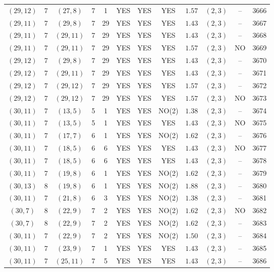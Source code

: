\begin{longtable}{|c|c|c|c|c|c|c|c|c|c|c|c|}
$(29,12)$ & 7 & $(27,8)$ & 7 & 1 & YES & YES & YES & $1.57$ & $(2,3)$ & -- & 3666\\
$(29,11)$ & 7 & $(29,8)$ & 7 & 29 & YES & YES & YES & $1.43$ & $(2,3)$ & -- & 3667\\
$(29,11)$ & 7 & $(29,11)$ & 7 & 29 & YES & YES & YES & $1.43$ & $(2,3)$ & -- & 3668\\
$(29,11)$ & 7 & $(29,11)$ & 7 & 29 & YES & YES & YES & $1.57$ & $(2,3)$ & NO & 3669\\
$(29,12)$ & 7 & $(29,8)$ & 7 & 29 & YES & YES & YES & $1.43$ & $(2,3)$ & -- & 3670\\
$(29,12)$ & 7 & $(29,11)$ & 7 & 29 & YES & YES & YES & $1.43$ & $(2,3)$ & -- & 3671\\
$(29,12)$ & 7 & $(29,12)$ & 7 & 29 & YES & YES & YES & $1.57$ & $(2,3)$ & -- & 3672\\
$(29,12)$ & 7 & $(29,12)$ & 7 & 29 & YES & YES & YES & $1.57$ & $(2,3)$ & NO & 3673\\
$(30,11)$ & 7 & $(13,5)$ & 5 & 1 & YES & YES & NO(2) & $1.38$ & $(2,3)$ & -- & 3674\\
$(30,11)$ & 7 & $(13,5)$ & 5 & 1 & YES & YES & YES & $1.43$ & $(2,3)$ & NO & 3675\\
$(30,11)$ & 7 & $(17,7)$ & 6 & 1 & YES & YES & NO(2) & $1.62$ & $(2,3)$ & -- & 3676\\
$(30,11)$ & 7 & $(18,5)$ & 6 & 6 & YES & YES & YES & $1.43$ & $(2,3)$ & NO & 3677\\
$(30,11)$ & 7 & $(18,5)$ & 6 & 6 & YES & YES & YES & $1.43$ & $(2,3)$ & -- & 3678\\
$(30,11)$ & 7 & $(19,8)$ & 6 & 1 & YES & YES & NO(2) & $1.62$ & $(2,3)$ & -- & 3679\\
$(30,13)$ & 8 & $(19,8)$ & 6 & 1 & YES & YES & NO(2) & $1.88$ & $(2,3)$ & -- & 3680\\
$(30,11)$ & 7 & $(21,8)$ & 6 & 3 & YES & YES & NO(2) & $1.38$ & $(2,3)$ & -- & 3681\\
$(30,7)$ & 8 & $(22,9)$ & 7 & 2 & YES & YES & NO(2) & $1.62$ & $(2,3)$ & NO & 3682\\
$(30,7)$ & 8 & $(22,9)$ & 7 & 2 & YES & YES & NO(2) & $1.62$ & $(2,3)$ & -- & 3683\\
$(30,11)$ & 7 & $(22,9)$ & 7 & 2 & YES & YES & NO(2) & $1.50$ & $(2,3)$ & -- & 3684\\
$(30,11)$ & 7 & $(23,9)$ & 7 & 1 & YES & YES & YES & $1.43$ & $(2,3)$ & -- & 3685\\
$(30,11)$ & 7 & $(25,11)$ & 7 & 5 & YES & YES & YES & $1.43$ & $(2,3)$ & -- & 3686\\

\end{longtable}
